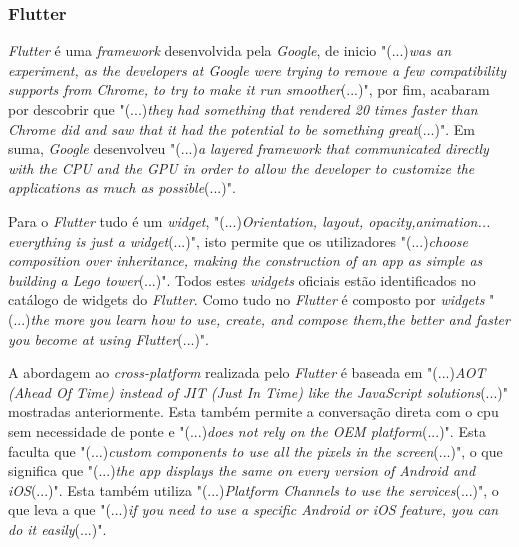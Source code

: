 \subsubsection{Flutter}\label{flutter_explaining}
\textit{Flutter} é uma \textit{framework} desenvolvida pela \textit{Google}, de inicio "(...)\emph{was an experiment, as the developers at Google were trying to remove a few compatibility supports from Chrome, to try to make it run smoother}(...)"\citep{flutter}, por fim, acabaram por descobrir que "(...)\emph{they had something that rendered 20 times faster than Chrome did and saw that it had the potential to be something great}(...)"\citep{flutter}. Em suma, \textit{Google} desenvolveu "(...)\emph{a layered framework that communicated directly with the CPU and the GPU in order to allow the developer to customize the applications as much as possible}(...)"\citep{flutter}.

Para o \textit{Flutter} tudo é um \textit{widget}, "(...)\emph{Orientation, layout, opacity,animation... everything is just a widget}(...)"\citep{flutter}, isto permite que os utilizadores "(...)\emph{choose composition over inheritance, making the construction of an app as simple as building a Lego tower}(...)"\citep{flutter}. Todos estes \textit{widgets} oficiais estão identificados no catálogo de widgets do \textit{Flutter}. Como tudo no \textit{Flutter} é composto por \textit{widgets} "(...)\emph{the more you learn how to use, create, and compose them,the better and faster you become at using Flutter}(...)"\citep{flutter}.

A abordagem ao \textit{cross-platform} realizada pelo \textit{Flutter} é baseada em "(...)\emph{AOT (Ahead Of Time) instead of JIT (Just In Time) like the JavaScript solutions}(...)"\citep{flutter} mostradas anteriormente. Esta também permite a conversação direta com o cpu sem necessidade de ponte e "(...)\emph{does not rely on the OEM platform}(...)"\citep{flutter}. Esta faculta que "(...)\emph{custom components to use all the pixels in the screen}(...)"\citep{flutter}, o que significa que "(...)\emph{the app displays the same on every version of Android and iOS}(...)"\citep{flutter}. Esta também utiliza "(...)\emph{Platform Channels to use the services}(...)"\citep{flutter}, o que leva a que "(...)\emph{if you need to use a specific Android or iOS feature, you can do it easily}(...)"\citep{flutter}.